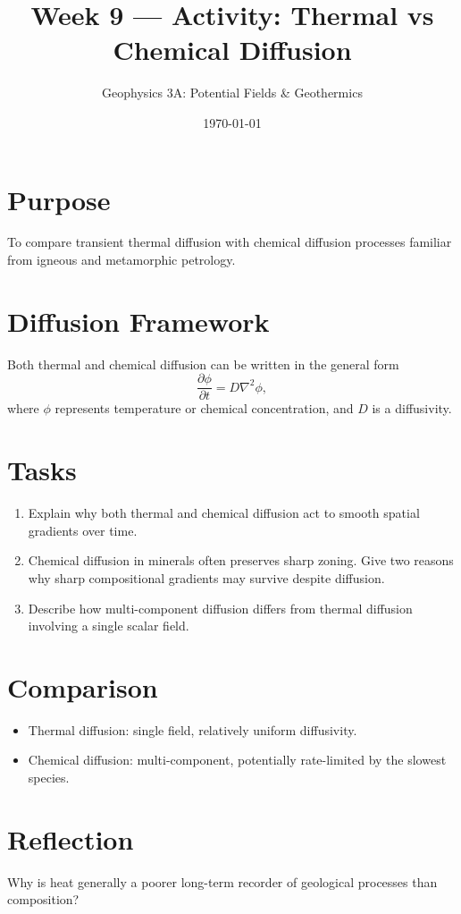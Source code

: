 \documentclass[11pt,a4paper]{article}
\title{Week 9 --- Activity: Thermal vs Chemical Diffusion}
\author{Geophysics 3A: Potential Fields \& Geothermics}
\date{\today}
\begin{document}
\maketitle

\vspace{1em}

\section*{Purpose}
To compare transient thermal diffusion with chemical diffusion processes familiar from igneous and metamorphic petrology.

\section*{Diffusion Framework}
Both thermal and chemical diffusion can be written in the general form
\[
\frac{\partial \phi}{\partial t} = D \nabla^2 \phi,
\]
where $\phi$ represents temperature or chemical concentration, and $D$ is a diffusivity.

\section*{Tasks}
\begin{enumerate}
  \item Explain why both thermal and chemical diffusion act to smooth spatial gradients over time.

  \item Chemical diffusion in minerals often preserves sharp zoning. Give two reasons why sharp compositional gradients may survive despite diffusion.

  \item Describe how multi-component diffusion differs from thermal diffusion involving a single scalar field.
\end{enumerate}

\section*{Comparison}
\begin{itemize}
  \item Thermal diffusion: single field, relatively uniform diffusivity.
  \item Chemical diffusion: multi-component, potentially rate-limited by the slowest species.
\end{itemize}

\section*{Reflection}
Why is heat generally a poorer long-term recorder of geological processes than composition?
\end{document}

